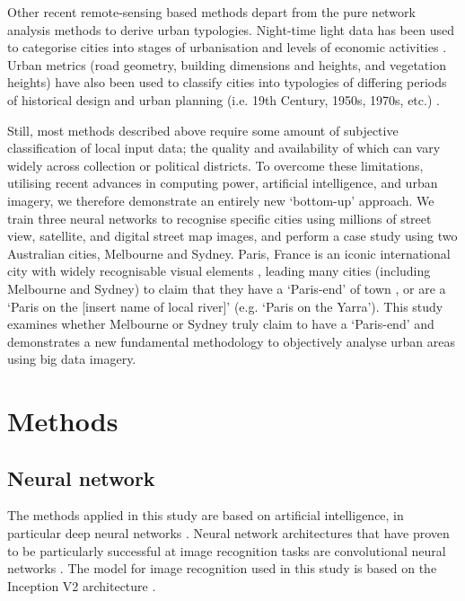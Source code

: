 \documentclass[10pt,letterpaper]{article}
\begin{document}
Other recent remote-sensing based methods depart from the pure network analysis methods to derive urban typologies. Night-time light data has been used to categorise cities into stages of urbanisation and levels of economic activities \cite{Zhang2013}. Urban metrics (road geometry, building dimensions and heights, and vegetation heights) have also been used to classify cities into typologies of differing periods of historical design and urban planning (i.e. 19th Century, 1950s, 1970s, etc.) \cite{Hermosilla2014}.

Still, most methods described above require some amount of subjective classification of local input data; the quality and availability of which can vary widely across collection or political districts. To overcome these limitations, utilising recent advances in computing power, artificial intelligence, and urban imagery, we therefore demonstrate an entirely new `bottom-up' approach. We train three neural networks to recognise specific cities using millions of street view, satellite, and digital street map images, and perform a case study using two Australian cities, Melbourne and Sydney. Paris, France is an iconic international city \cite{Anholt2006} with widely recognisable visual elements \cite{Doersch2012}, leading many cities (including Melbourne and Sydney) to claim that they have a `Paris-end' of town \cite{Williams2010}, or are a `Paris on the [insert name of local river]' \cite{Wilden2013} (e.g. `Paris on the Yarra'). This study examines whether Melbourne or Sydney truly claim to have a `Paris-end' and demonstrates a new fundamental methodology to objectively analyse urban areas using big data imagery.

\section*{Methods}\label{sec:methods}
\subsection*{Neural network}\label{sec:methods1}

The methods applied in this study are based on artificial intelligence, in particular deep neural networks \cite{Bishop1995,Samarasinghe2016,Graupe2013}. Neural network architectures that have proven to be particularly successful at image recognition tasks are convolutional neural networks \cite{Schmidhuber2015}. The model for image recognition used in this study is based on the Inception V2 architecture \cite{Szegedy2015,Ioffe2015}. 
\end{document}
